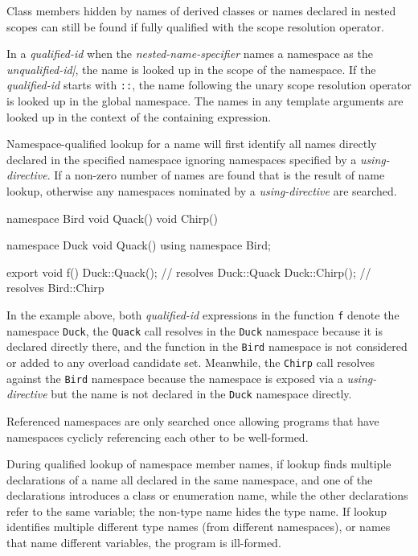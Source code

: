 \p Class members hidden by names of derived classes or names declared in nested
scopes can still be found if fully qualified with the scope resolution operator.


\p In a \textit{qualified-id} when the \textit{nested-name-specifier} names a
namespace as the \textit{unqualified-id|}, the name is looked up in the scope of
the namespace. If the \textit{qualified-id} starts with \texttt{::}, the name
following the unary scope resolution operator is looked up in the global
namespace. The names in any template arguments are looked up in the context of
the containing expression.

\p Namespace-qualified lookup for a name will first identify all names directly
declared in the specified namespace ignoring namespaces specified by a
\textit{using-directive}. If a non-zero number of names are found that is the
result of name lookup, otherwise any namespaces nominated by a
\textit{using-directive} are searched.

\begin{HLSL}
namespace Bird {
    void Quack() {}
    void Chirp() {}
}

namespace Duck {
    void Quack() {}
    using namespace Bird;
}

export void f() {
    Duck::Quack();  // resolves Duck::Quack
    Duck::Chirp();  // resolves Bird::Chirp
}
\end{HLSL}

\begin{note}
In the example above, both \textit{qualified-id} expressions in the function
\texttt{f} denote the namespace \texttt{Duck}, the \texttt{Quack} call resolves
in the \texttt{Duck} namespace because it is declared directly there, and the
function in the \texttt{Bird} namespace is not considered or added to any
overload candidate set. Meanwhile, the \texttt{Chirp} call resolves against the
\texttt{Bird} namespace because the namespace is exposed via a
\textit{using-directive} but the name is not declared in the \texttt{Duck}
namespace directly.
\end{note}

\p Referenced namespaces are only searched once allowing programs that have
namespaces cyclicly referencing each other to be well-formed.

\p During qualified lookup of namespace member names, if lookup finds multiple
declarations of a name all declared in the same namespace, and one of the
declarations introduces a class or enumeration name, while the other
declarations refer to the same variable; the non-type name hides the type name.
If lookup identifies multiple different type names (from different namespaces),
or names that name different variables, the program is ill-formed.

